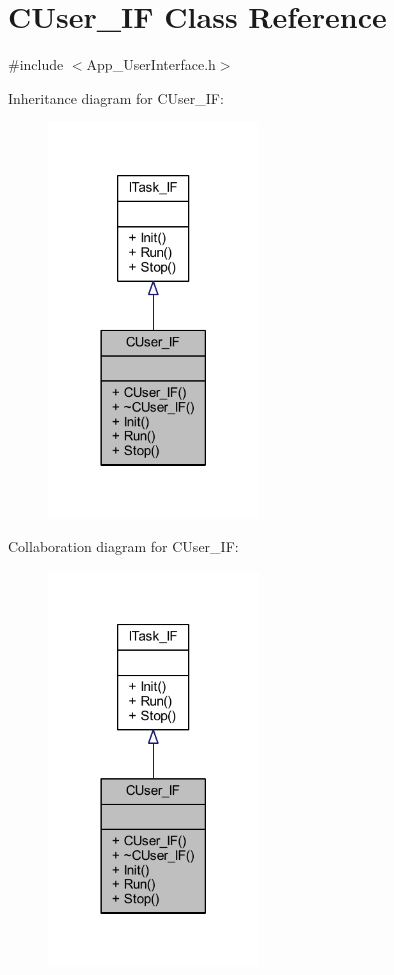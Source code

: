 \hypertarget{class_c_user___i_f}{}\section{C\+User\+\_\+\+IF Class Reference}
\label{class_c_user___i_f}


{\ttfamily \#include $<$App\+\_\+\+User\+Interface.\+h$>$}



Inheritance diagram for C\+User\+\_\+\+IF\+:\nopagebreak
\begin{figure}[H]
\begin{center}
\leavevmode
\includegraphics[width=158pt]{class_c_user___i_f__inherit__graph}
\end{center}
\end{figure}


Collaboration diagram for C\+User\+\_\+\+IF\+:\nopagebreak
\begin{figure}[H]
\begin{center}
\leavevmode
\includegraphics[width=158pt]{class_c_user___i_f__coll__graph}
\end{center}
\end{figure}
